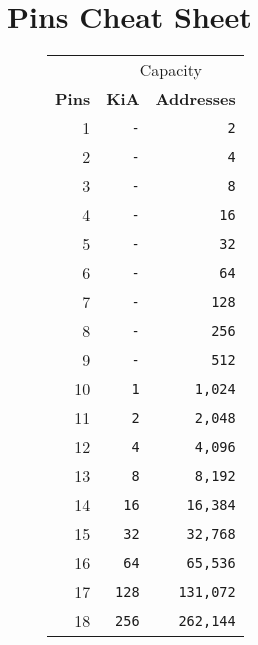 \chapter*{Pins Cheat Sheet}


\begin{figure}[H]
\begin{minipage}[t]{0.49\linewidth}
{ 
\setlength{\tabcolsep}{3.0pt}
\setlength\cmidrulewidth{\heavyrulewidth} %
\begin{tabular}{rrr}

  & \multicolumn{2}{c}{Capacity} \\
  \cmidrule(lr){2-3}
  
 
  \textbf{Pins} & \textbf{KiA} & \textbf{Addresses}\\               
            
  \toprule    
1            &    \texttt{-} &      \texttt{2}   \\
2   &\texttt{-}            &      \texttt{4}   \\
3  &    \texttt{-} &      \texttt{8}   \\
4  &\texttt{-}            &      \texttt{16}   \\
5  &    \texttt{-} &      \texttt{32}   \\
6   &    \texttt{-} &      \texttt{64}   \\
7   &    \texttt{-} &      \texttt{128}   \\
8            &    \texttt{-} &      \texttt{256}   \\
9           &    \texttt{-} &      \texttt{512}   \\
10   &    \texttt{1}           &      \texttt{1,024} \\
11   &    \texttt{2}           &\texttt{2,048}    \\
12   &    \texttt{4}           &      \texttt{4,096} \\
13   &    \texttt{8}          &      \texttt{8,192} \\
14            &    \texttt{16}           &      \texttt{16,384} \\
15  &    \texttt{32}           &\texttt{32,768}    \\
16  &    \texttt{64}           &\texttt{65,536}    \\
17   &    \texttt{128}           &      \texttt{131,072} \\
18  &    \texttt{ 256}           &      \texttt{ 262,144} \\
  \toprule    
\end{tabular}%
}
\end{minipage}%
\begin{minipage}[t]{0.49\linewidth}
{ 
\setlength{\tabcolsep}{3.0pt}
\setlength\cmidrulewidth{\heavyrulewidth} %
\begin{tabular}{rrr}


\end{tabular}}
\end{minipage}
\end{figure}
